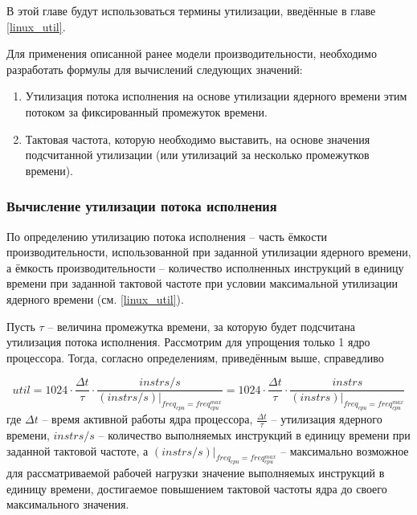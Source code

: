     В этой главе будут использоваться термины утилизации, введённые в главе \ref{linux_util}.

    Для применения описанной ранее модели производительности, необходимо разработать формулы для
    вычислений следующих значений:
    \begin{enumerate}
        \item Утилизация потока исполнения на основе утилизации ядерного времени этим потоком за
        фиксированный промежуток времени.
        \item Тактовая частота, которую необходимо выставить, на основе значения подсчитанной
        утилизации (или утилизаций за несколько промежутков времени).
    \end{enumerate}

\subsubsection{Вычисление утилизации потока исполнения}

    По определению утилизацию потока исполнения -- часть ёмкости производительности,
    использованной при заданной утилизации ядерного времени, а
    ёмкость производительности -- количество исполненных инструкций в единицу времени при заданной
    тактовой частоте при условии максимальной утилизации ядерного времени (см. \ref{linux_util}).

    Пусть $\tau$ -- величина промежутка времени, за которую будет подсчитана утилизация потока исполнения.
    Рассмотрим для упрощения только 1 ядро процессора. Тогда, согласно определениям, приведённым выше,
    справедливо

    \begin{equation}
        util = 1024 \cdot \frac{\Delta t}{\tau} \cdot \frac{instrs / s}{(instrs / s) |_{freq_{cpu} = freq_{cpu}^{max}}} =
            1024 \cdot \frac{\Delta t}{\tau} \cdot \frac{instrs}{(instrs) |_{freq_{cpu} = freq_{cpu}^{max}}}
    \end{equation}
    где $\Delta t$ -- время активной работы ядра процессора, $\frac{\Delta t}{\tau}$ -- утилизация ядерного
    времени, $instrs / s$ -- количество выполняемых инструкций в единицу времени при заданной тактовой
    частоте, а $(instrs / s) |_{freq_{cpu} = freq_{cpu}^{max}}$ -- максимально возможное для
    рассматриваемой рабочей нагрузки значение выполняемых инструкций в единицу времени, достигаемое
    повышением тактовой частоты ядра до своего максимального значения.


